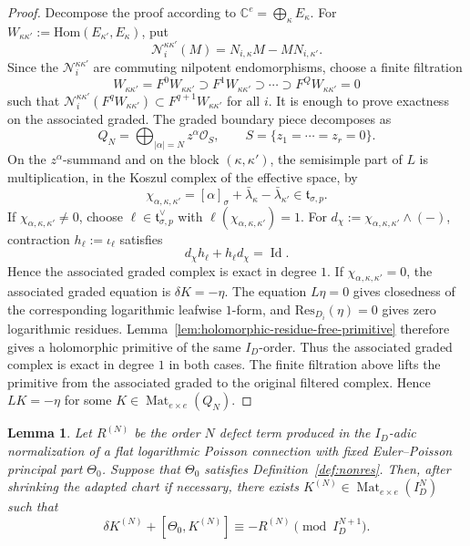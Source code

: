 \documentclass[11pt]{amsart}
\theoremstyle{plain}
\newtheorem{lemma}[theorem]{Lemma}
\theoremstyle{definition}
\DeclareMathOperator{\Mat}{Mat}
\DeclareMathOperator{\Id}{Id}
\theoremstyle{definition}
\newcommand{\C}{\mathbb{C}}
\newcommand{\OO}{\mathcal{O}}
\newcommand{\Hom}{\mathrm{Hom}}
\newcommand{\Res}{\mathrm{Res}}
\begin{document}
\begin{proof}
Decompose the proof according to $\C^e=\bigoplus_\kappa E_\kappa$.  For
$W_{\kappa\kappa'}:=\Hom(E_{\kappa'},E_\kappa)$, put
\[
        \mathcal N_i^{\kappa\kappa'}(M)
        =
        N_{i,\kappa}M-MN_{i,\kappa'} .
\]
Since the $\mathcal N_i^{\kappa\kappa'}$ are commuting nilpotent endomorphisms,
choose a finite filtration
\[
        W_{\kappa\kappa'}=F^0W_{\kappa\kappa'}
        \supset F^1W_{\kappa\kappa'}
        \supset\cdots\supset F^QW_{\kappa\kappa'}=0
\]
such that $\mathcal N_i^{\kappa\kappa'}(F^qW_{\kappa\kappa'})\subset
F^{q+1}W_{\kappa\kappa'}$ for all $i$.  It is enough to prove exactness on the
associated graded.
The graded boundary piece decomposes as
\[
        Q_N=\bigoplus_{|\alpha|=N}z^\alpha\OO_S,
        \qquad
        S=\{z_1=\cdots=z_r=0\}.
\]
On the $z^\alpha$-summand and on the block $(\kappa,\kappa')$, the semisimple
part of $L$ is multiplication, in the Koszul complex of the effective space, by
\[
        \chi_{\alpha,\kappa,\kappa'}
        =
        [\alpha]_\sigma+\bar\lambda_\kappa-\bar\lambda_{\kappa'}
        \in\mathfrak t_{\sigma,p}.
\]
If $\chi_{\alpha,\kappa,\kappa'}\neq0$, choose
$\ell\in\mathfrak t_{\sigma,p}^{\vee}$ with
$\ell(\chi_{\alpha,\kappa,\kappa'})=1$.  For
$d_\chi:=\chi_{\alpha,\kappa,\kappa'}\wedge(-)$, contraction
$h_\ell:=\iota_\ell$ satisfies
\[
        d_\chi h_\ell+h_\ell d_\chi=\Id .
\]
Hence the associated graded complex is exact in degree $1$.
If $\chi_{\alpha,\kappa,\kappa'}=0$, the associated graded equation is
$\delta K=-\eta$.  The equation $L\eta=0$ gives closedness of the corresponding
logarithmic leafwise $1$-form, and $\Res_{D_i}(\eta)=0$ gives zero logarithmic
residues.  Lemma~\ref{lem:holomorphic-residue-free-primitive} therefore gives
a holomorphic primitive of the same $I_D$-order.
Thus the associated graded complex is exact in degree $1$ in both cases.  The
finite filtration above lifts the primitive from the associated graded to the
original filtered complex.  Hence $LK=-\eta$ for some
$K\in\Mat_{e\times e}(Q_N)$.
\end{proof}

\begin{lemma}\label{lem:EP-homological-equation}
Let $R^{(N)}$ be the order $N$ defect term produced in the $I_D$-adic
normalization of a flat logarithmic Poisson connection with fixed
Euler--Poisson principal part $\Theta_0$.  Suppose that $\Theta_0$ satisfies
Definition~\ref{def:nonres}.  Then, after shrinking the adapted chart if
necessary, there exists $K^{(N)}\in\Mat_{e\times e}(I_D^N)$ such that
\[
        \delta K^{(N)}+[\Theta_0,K^{(N)}]
        \equiv
        -R^{(N)}
        \pmod {I_D^{N+1}} .
\]
\end{lemma}
\end{document}

